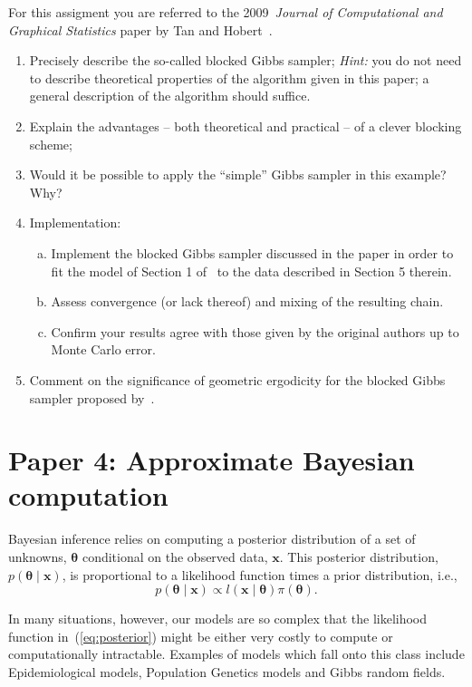 \documentclass[a4paper,10pt, notitlepage]{report}
\begin{document}
For this assigment you are referred to the 2009~\textit{Journal of Computational and Graphical Statistics} paper by Tan and Hobert~\citep{Tan2009}.

\begin{enumerate}
 \item Precisely describe the so-called blocked Gibbs sampler;
 \textit{Hint:} you do not need to describe theoretical properties of the algorithm given in this paper; a general description of the algorithm should suffice. 
 \item Explain the advantages -- both theoretical and practical -- of a clever blocking scheme;
 \item Would it be possible to apply the ``simple'' Gibbs sampler in this example? Why?
 \item Implementation:
 \begin{enumerate}[(a)]
  \item Implement the blocked Gibbs sampler discussed in the paper in order to fit the model of Section 1 of~\cite{Tan2009} to the data described in Section 5 therein.
  \item Assess convergence (or lack thereof) and mixing of the resulting chain.
  \item Confirm your results agree with those given by the original authors up to Monte Carlo error.
 \end{enumerate}  
 \item Comment on the significance of geometric ergodicity for the blocked Gibbs sampler proposed by~\cite{Tan2009}.
\end{enumerate}

\section*{Paper 4: Approximate Bayesian computation~\citep{Beaumont2002}}

Bayesian inference relies on computing a posterior distribution of a set of unknowns, $\boldsymbol{\theta}$ conditional on the observed data, $\boldsymbol{x}$.
This posterior distribution, $p(\boldsymbol{\theta} \mid \boldsymbol{x})$, is proportional to a likelihood function times a prior distribution, i.e.,
\begin{equation}
 \label{eq:posterior}
 p(\boldsymbol{\theta} \mid \boldsymbol{x}) \propto l(\boldsymbol{x} \mid \boldsymbol{\theta})\pi(\boldsymbol{\theta}).
\end{equation}
 
In many situations, however, our models are so complex that the likelihood function in~(\ref{eq:posterior}) might be either very costly to compute or computationally intractable. 
Examples of models which fall onto this class include Epidemiological models, Population Genetics models and Gibbs random fields.
\end{document}
